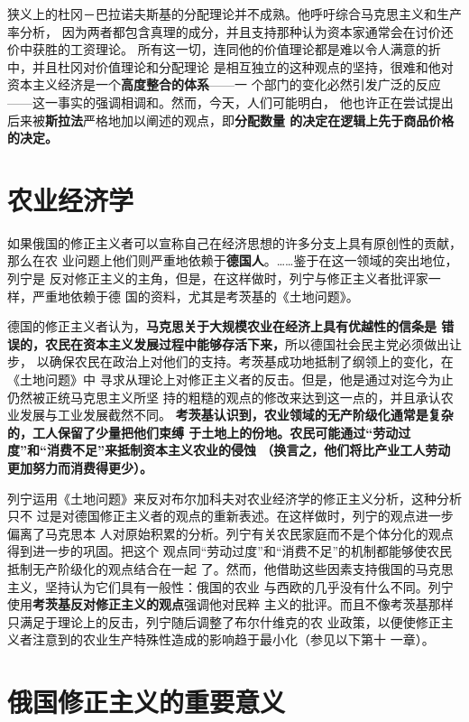 狭义上的杜冈－巴拉诺夫斯基的分配理论并不成熟。他呼吁综合马克思主义和生产率分析，
因为两者都包含真理的成分，并且支持那种认为资本家通常会在讨价还价中获胜的工资理论。
所有这一切，连同他的价值理论都是难以令人满意的折中，并且杜冈对价值理论和分配理论
是相互独立的这种观点的坚持，很难和他对资本主义经济是一个\textbf{高度整合的体系}——一
个部门的变化必然引发广泛的反应——这一事实的强调相调和。然而，今天，人们可能明白，
他也许正在尝试提出后来被\textbf{斯拉法}严格地加以阐述的观点，即\textbf{分配数量
的决定在逻辑上先于商品价格的决定。}

\section{农业经济学}

如果俄国的修正主义者可以宣称自己在经济思想的许多分支上具有原创性的贡献，那么在农
业问题上他们则严重地依赖于\textbf{德国人}。……鉴于在这一领域的突出地位，列宁是
反对修正主义的主角，但是，在这样做时，列宁与修正主义者批评家一样，严重地依赖于德
国的资料，尤其是考茨基的《土地问题》。

德国的修正主义者认为，\textbf{马克思关于大规模农业在经济上具有优越性的信条是
错误的，农民在资本主义发展过程中能够存活下来，}所以德国社会民主党必须做出让步，
以确保农民在政治上对他们的支持。考茨基成功地抵制了纲领上的变化，在《土地问题》中
寻求从理论上对修正主义者的反击。但是，他是通过对迄今为止仍然被正统马克思主义所坚
持的粗糙的观点的修改来达到这一点的，并且承认农业发展与工业发展截然不同。
\textbf{考茨基认识到，农业领域的无产阶级化通常是复杂的，工人保留了少量把他们束缚
于土地上的份地。农民可能通过“劳动过度”和“消费不足”来抵制资本主义农业的侵蚀
（换言之，他们将比产业工人劳动更加努力而消费得更少）。}

列宁运用《土地问题》来反对布尔加科夫对农业经济学的修正主义分析，这种分析只不
过是对德国修正主义者的观点的重新表述。在这样做时，列宁的观点进一步偏离了马克思本
人对原始积累的分析。列宁有关农民家庭而不是个体分化的观点得到进一步的巩固。把这个
观点同“劳动过度”和“消费不足”的机制都能够使农民抵制无产阶级化的观点结合在一起
了。然而，他借助这些因素支持俄国的马克思主义，坚持认为它们具有一般性：俄国的农业
与西欧的几乎没有什么不同。列宁使用\textbf{考茨基反对修正主义的观点}强调他对民粹
主义的批评。而且不像考茨基那样只满足于理论上的反击，列宁随后调整了布尔什维克的农
业政策，以便使修正主义者注意到的农业生产特殊性造成的影响趋于最小化（参见以下第十
一章）。

\section{俄国修正主义的重要意义}

